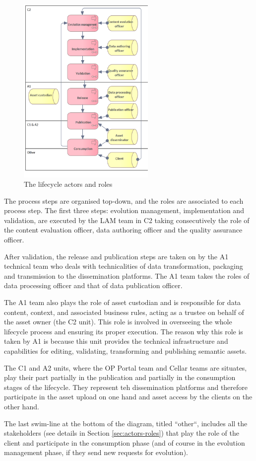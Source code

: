 	\begin{figure}[!h]
	\centering
	\includegraphics[width=0.59\textwidth]{images/business/lifecycle/Lifecycle roles.png}
	\caption{The lifecycle actors and roles}
	\label{fig:lifecycle-roles}
	\end{figure}

	The process steps are organised top-down, and the roles are associated to each process step. The first three steps: evolution management, implementation and validation, are executed by the LAM team in C2 taking consecutively the role of the content evaluation officer, data authoring officer and the quality assurance officer. 
	
	After validation, the release and publication steps are taken on by the A1 technical team who deals with technicalities of data transformation, packaging and transmission to the dissemination platforms. The A1 team takes the roles of data processing officer and that of data publication officer. 
	
	The A1 team also plays the role of asset custodian and is responsible for data content, context, and associated business rules, acting as a trustee on behalf of the asset owner (the C2 unit). This role is involved in overseeing the whole lifecycle process and ensuring its proper execution. The reason why this role is taken by A1 is because this unit provides the technical infrastructure and capabilities for editing, validating, transforming and publishing semantic assets. 
	
	The C1 and A2 units, where the OP Portal team and Cellar teams are situates, play their part partially in the publication and partially in the consumption stages of the lifecycle. They represent teh dissemination platforms and therefore participate in the asset upload on one hand and asset access by the clients on the other hand. 
	
	The last swim-line at the bottom of the diagram, titled ``other``, includes all the stakeholders (see details in Section \ref{sec:actors-roles}) that play the role of the client and participate in the consumption phase (and of course in the evolution management phase, if they send new requests for evolution). 

	
	
	